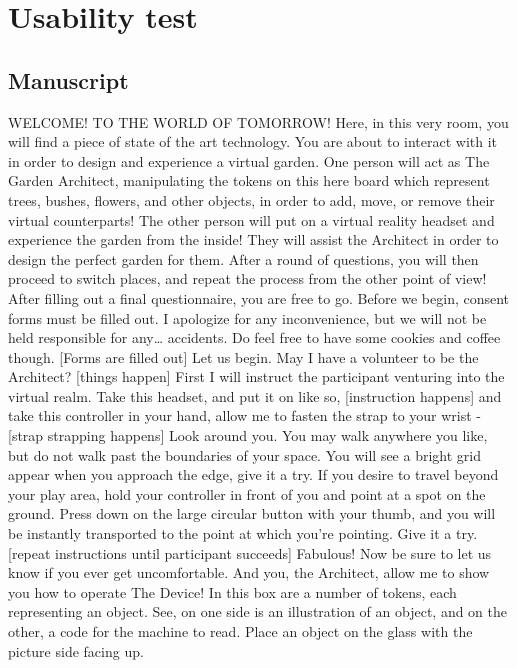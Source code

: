 \section{Usability test}\label{sec:appendixUsability}
	\subsection{Manuscript}\label{sec:appendixUsabilityManuscript}
		WELCOME! TO THE WORLD OF TOMORROW!
		Here, in this very room, you will find a piece of state of the art technology. You are about to interact with it in order to design and experience a virtual garden. One person will act as The Garden Architect, manipulating the tokens on this here board which represent trees, bushes, flowers, and other objects, in order to add, move, or remove their virtual counterparts! The other person will put on a virtual reality headset and experience the garden from the inside! They will assist the Architect in order to design the perfect garden for them. After a round of questions, you will then proceed to switch places, and repeat the process from the other point of view! After filling out a final questionnaire, you are free to go. 
		Before we begin, consent forms must be filled out. I apologize for any inconvenience, but we will not be held responsible for any… accidents. Do feel free to have some cookies and coffee though. 
		[Forms are filled out]
		Let us begin. May I have a volunteer to be the Architect? 
		[things happen]
		First I will instruct the participant venturing into the virtual realm. Take this headset, and put it on like so,
		[instruction happens]
		and take this controller in your hand, allow me to fasten the strap to your wrist -
		[strap strapping happens]
		Look around you. You may walk anywhere you like, but do not walk past the boundaries of your space. You will see a bright grid appear when you approach the edge, give it a try. If you desire to travel beyond your play area, hold your controller in front of you and point at a spot on the ground. Press down on the large circular button with your thumb, and you will be instantly transported to the point at which you’re pointing. Give it a try. 
		[repeat instructions until participant succeeds]
		Fabulous! Now be sure to let us know if you ever get uncomfortable. And you, the Architect, allow me to show you how to operate The Device! In this box are a number of tokens, each representing an object. See, on one side is an illustration of an object, and on the other, a code for the machine to read. Place an object on the glass with the picture side facing up. 
